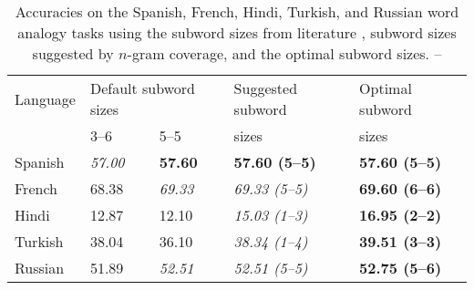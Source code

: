 \begin{table}
\centering
\begin{tabular}{@{}lllll@{}}
\toprule
Language & \multicolumn{2}{l}{Default subword sizes} & Suggested subword & Optimal subword \\
& \multicolumn{1}{p{1.3cm}}{3--6} & \multicolumn{1}{p{1.3cm}}{5--5} & sizes & sizes \\
\midrule
Spanish & \textit{57.00} & \textbf{57.60} & \textbf{57.60 (5--5)} & \textbf{57.60 (5--5)} \\
French  & 68.38 & \textit{69.33} & \textit{69.33 (5--5)} & \textbf{69.60 (6--6)} \\
Hindi   & 12.87 & 12.10 & \textit{15.03 (1--3)} & \textbf{16.95 (2--2)} \\
Turkish & 38.04 & 36.10 & \textit{38.34 (1--4)} & \textbf{39.51 (3--3)} \\
Russian & 51.89 & \textit{52.51} & \textit{52.51 (5--5)} & \textbf{52.75 (5--6)} \\
\bottomrule
\end{tabular}
\caption{Accuracies on the Spanish, French, Hindi, Turkish, and Russian word analogy tasks using the subword sizes from literature \cite{bojanowski2017enriching, grave2018learning}, subword sizes suggested by $n$-gram coverage, and the optimal subword sizes. -- \textcite[Table 4]{novotny2021one}}
\label{table:accuracies-test}
\end{table}